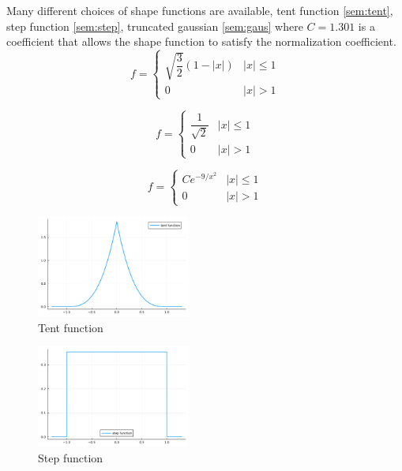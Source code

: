 \documentclass{juliacon}
\begin{document}
Many different choices of shape functions are available, tent function \ref{sem:tent}, step function  \ref{sem:step}, truncated gaussian \ref{sem:gaus}  where $C=1.301$ is a coefficient that allows the shape function to satisfy the normalization coefficient.
\begin{equation}
f = 
\begin{cases}
  \sqrt{\dfrac{3}{2}}(1-|x|) & |x|\leq 1 \\
  0 & |x|>1
\end{cases}
\label{sem:tent}
\end{equation}

\begin{equation}
f = 
\begin{cases}
  \dfrac{1}{\sqrt{2}} & |x|\leq 1 \\
  0 & |x|>1
\end{cases}
\label{sem:step}
\end{equation}


\begin{equation}
f = 
\begin{cases}
  C e^{-9/x^2} & |x|\leq 1 \\
  0 & |x|>1
\end{cases}
\label{sem:gaus}
\end{equation}

\begin{figure}[h]
     \centering
\includegraphics[width=0.45\textwidth]{Images/shape/tent_fun.png}
         \caption{Tent function}          
         \label{figsem:tent_fun}
\end{figure}

\begin{figure}[h]
     \centering
         \includegraphics[width=0.45\textwidth]{Images/shape/step_fun.png}
         \caption{Step function}
            \label{figsem:step_fun}
\end{figure}
\end{document}
